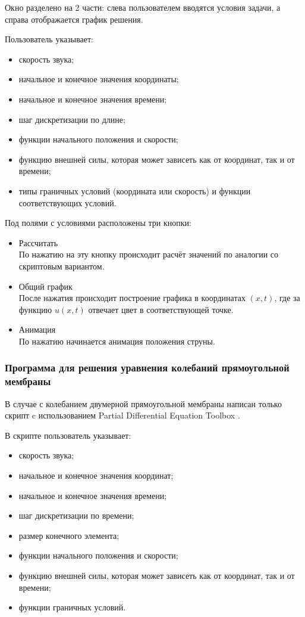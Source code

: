 \documentclass[12pt,a4paper,russian]{report}
\begin{document}
	 Окно разделено на 2 части: слева пользователем вводятся условия задачи, а справа отображается график решения.
	 
	 Пользователь указывает:
	 \begin{itemize}
	 	\item скорость звука;
	 	\item начальное и конечное значения координаты;
	 	\item начальное и конечное значения времени;
	 	\item шаг дискретизации по длине;
	 	\item функции начального положения и скорости;
	 	\item функцию внешней силы, которая может зависеть как от координат, так и от времени;
	 	\item типы граничных условий (координата или скорость) и функции соответствующих условий.
	 \end{itemize}
	 
	 Под полями с условиями расположены три кнопки:
	 \begin{itemize}
	 	\item Рассчитать \\
	 	По нажатию на эту кнопку происходит расчёт значений по аналогии со скриптовым вариантом.
	 	
	 	\item  Общий график \\
	 	После нажатия происходит построение графика в координатах $(x, t)$, где за функцию $u(x, t)$ отвечает цвет в соответствующей точке.
	 	
	 	\item Анимация \\
	 	По нажатию начинается анимация положения струны.
	 \end{itemize}
	 
	 \subsubsection{Программа для решения уравнения колебаний прямоугольной мембраны}
	
	В случае с колебанием двумерной прямоугольной мембраны написан только скрипт c использованием Partial Differential Equation Toolbox \cite{MathWorks_PDEToolbox}.
	
	В скрипте пользователь указывает:
	\begin{itemize}
		\item скорость звука;
		\item начальное и конечное значения координат;
		\item начальное и конечное значения времени;
		\item шаг дискретизации по времени;
		\item размер конечного элемента;
		\item функции начального положения и скорости;
		\item функцию внешней силы, которая может зависеть как от координат, так и от времени;
		\item функции граничных условий.
	\end{itemize}
	
\end{document}

